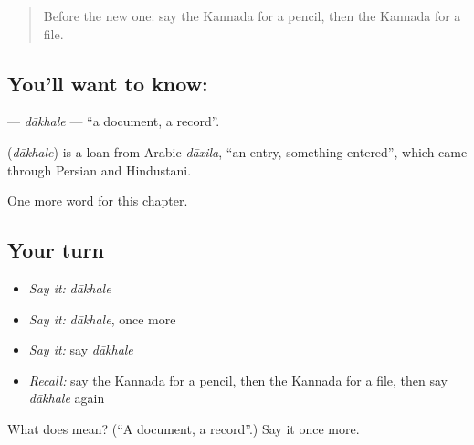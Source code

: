 \label{lesson:KA-C186-dakhale}



\begin{quote}
Before the new one: say the Kannada for a pencil, then the Kannada for a file.
\end{quote}

\subsection*{You'll want to know: }
\textbf{} — \emph{dākhale} — \textquotedblleft{}a document, a record\textquotedblright{}.

\begin{cousinweb}
\textbf{} (\emph{dākhale}) is a loan from Arabic \emph{dāxila}, \textquotedblleft{}an entry, something entered\textquotedblright{}, which came through Persian and Hindustani.
\end{cousinweb}

\begin{grammarlens}[title={What you've built}]
One more word for this chapter.
\end{grammarlens}

\subsection*{Your turn}
\begin{itemize}
\raggedright
  \item \emph{Say it:} \emph{dākhale}
  \item \emph{Say it:} \emph{dākhale}, once more
  \item \emph{Say it:} say \emph{dākhale}
  \item \emph{Recall:} say the Kannada for a pencil, then the Kannada for a file, then say \emph{dākhale} again
\end{itemize}

\begin{tcolorbox}[breakable,colback=teal!4,colframe=teal!35!black,title={Before you move on}]
What does  mean? (\textquotedblleft{}A document, a record\textquotedblright{}.) Say it once more.
\end{tcolorbox}
